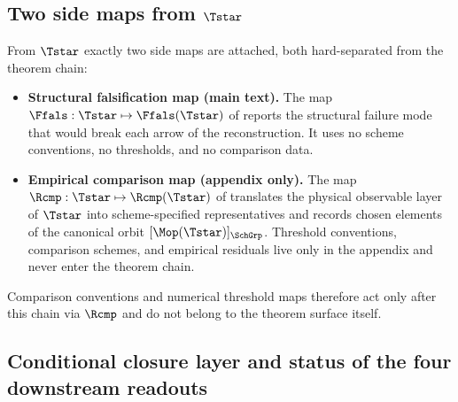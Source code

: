 \subsection{Two side maps from \texorpdfstring{$\Tstar$}{T-star}}

From $\Tstar$ exactly two side maps are attached, both hard-separated from the theorem chain:
\begin{itemize}[leftmargin=1.5em, topsep=3pt, itemsep=2pt]
    \item \textbf{Structural falsification map (main text).} The map
    $\Ffals:\Tstar\mapsto\Ffals(\Tstar)$ of  reports the
    structural failure mode that would break each arrow of the reconstruction. It uses no
    scheme conventions, no thresholds, and no comparison data.
    \item \textbf{Empirical comparison map (appendix only).} The map
    $\Rcmp:\Tstar\mapsto\Rcmp(\Tstar)$ of  translates the
    physical observable layer of $\Tstar$ into scheme-specified representatives and records chosen
    elements of the canonical orbit $[\Mop(\Tstar)]_{\SchGrp}$. Threshold conventions, comparison
    schemes, and empirical residuals live only in the appendix and never enter the theorem chain.
\end{itemize}
Comparison conventions and numerical threshold maps therefore act only after this chain via
$\Rcmp$ and do not belong to the theorem surface itself.

\subsection{Conditional closure layer and status of the four downstream readouts}
\label{subsec:conditional-closure-status}

